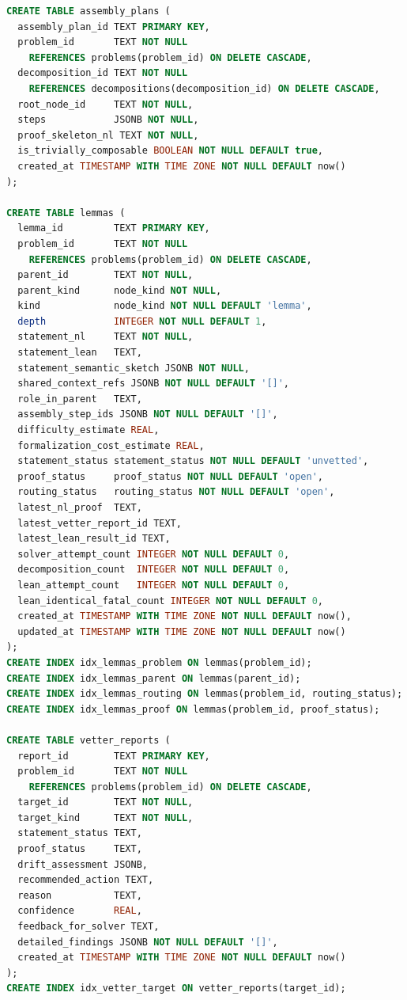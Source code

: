 \documentclass[11pt,a4paper]{article}
\begin{document}
\begin{lstlisting}[language=sql]
CREATE TABLE assembly_plans (
  assembly_plan_id TEXT PRIMARY KEY,
  problem_id       TEXT NOT NULL
    REFERENCES problems(problem_id) ON DELETE CASCADE,
  decomposition_id TEXT NOT NULL
    REFERENCES decompositions(decomposition_id) ON DELETE CASCADE,
  root_node_id     TEXT NOT NULL,
  steps            JSONB NOT NULL,
  proof_skeleton_nl TEXT NOT NULL,
  is_trivially_composable BOOLEAN NOT NULL DEFAULT true,
  created_at TIMESTAMP WITH TIME ZONE NOT NULL DEFAULT now()
);

CREATE TABLE lemmas (
  lemma_id         TEXT PRIMARY KEY,
  problem_id       TEXT NOT NULL
    REFERENCES problems(problem_id) ON DELETE CASCADE,
  parent_id        TEXT NOT NULL,
  parent_kind      node_kind NOT NULL,
  kind             node_kind NOT NULL DEFAULT 'lemma',
  depth            INTEGER NOT NULL DEFAULT 1,
  statement_nl     TEXT NOT NULL,
  statement_lean   TEXT,
  statement_semantic_sketch JSONB NOT NULL,
  shared_context_refs JSONB NOT NULL DEFAULT '[]',
  role_in_parent   TEXT,
  assembly_step_ids JSONB NOT NULL DEFAULT '[]',
  difficulty_estimate REAL,
  formalization_cost_estimate REAL,
  statement_status statement_status NOT NULL DEFAULT 'unvetted',
  proof_status     proof_status NOT NULL DEFAULT 'open',
  routing_status   routing_status NOT NULL DEFAULT 'open',
  latest_nl_proof  TEXT,
  latest_vetter_report_id TEXT,
  latest_lean_result_id TEXT,
  solver_attempt_count INTEGER NOT NULL DEFAULT 0,
  decomposition_count  INTEGER NOT NULL DEFAULT 0,
  lean_attempt_count   INTEGER NOT NULL DEFAULT 0,
  lean_identical_fatal_count INTEGER NOT NULL DEFAULT 0,
  created_at TIMESTAMP WITH TIME ZONE NOT NULL DEFAULT now(),
  updated_at TIMESTAMP WITH TIME ZONE NOT NULL DEFAULT now()
);
CREATE INDEX idx_lemmas_problem ON lemmas(problem_id);
CREATE INDEX idx_lemmas_parent ON lemmas(parent_id);
CREATE INDEX idx_lemmas_routing ON lemmas(problem_id, routing_status);
CREATE INDEX idx_lemmas_proof ON lemmas(problem_id, proof_status);

CREATE TABLE vetter_reports (
  report_id        TEXT PRIMARY KEY,
  problem_id       TEXT NOT NULL
    REFERENCES problems(problem_id) ON DELETE CASCADE,
  target_id        TEXT NOT NULL,
  target_kind      TEXT NOT NULL,
  statement_status TEXT,
  proof_status     TEXT,
  drift_assessment JSONB,
  recommended_action TEXT,
  reason           TEXT,
  confidence       REAL,
  feedback_for_solver TEXT,
  detailed_findings JSONB NOT NULL DEFAULT '[]',
  created_at TIMESTAMP WITH TIME ZONE NOT NULL DEFAULT now()
);
CREATE INDEX idx_vetter_target ON vetter_reports(target_id);


\end{lstlisting}
\end{document}
